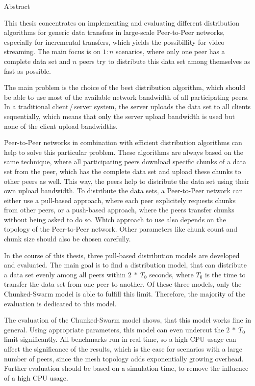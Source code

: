 
\begin{center} 
\huge Abstract
\end{center}


This thesis concentrates on implementing and evaluating different distribution algorithms for generic data transfers in large-scale Peer-to-Peer networks, especially for incremental transfers, which yields the possibillity for video streaming. The main focus is on $1:n$ scenarios, where only one peer has a complete data set and $n$ peers try to distribute this data set among themselves as fast as possible.

The main problem is the choice of the best distribution algorithm, which should be able to use most of the available network bandwidth of all participating peers. In a traditional client\,/\,server system, the server uploads the data set to all clients sequentially, which means that only the server upload bandwidth is used but none of the client upload bandwidths.

Peer-to-Peer networks in combination with efficient distribution algorithms can help to solve this particular problem. These algorithms are always based on the same technique, where all participating peers download specific chunks of a data set from the peer, which has the complete data set and upload these chunks to other peers as well. This way, the peers help to distribute the data set using their own upload bandwidth. To distribute the data sets, a Peer-to-Peer network can either use a pull-based approach, where each peer explicitely requests chunks from other peers, or a push-based approach, where the peers transfer chunks without being asked to do so. Which approach to use also depends on the topology of the Peer-to-Peer network. Other parameters like chunk count and chunk size should also be chosen carefully.

In the course of this thesis, three pull-based distribution models are developed and evaluated. The main goal is to find a distribution model, that can distribute a data set evenly among all peers within $2\:*\:T_0$ seconds, where $T_0$ is the time to transfer the data set from one peer to another. Of these three models, only the Chunked-Swarm model is able to fulfill this limit. Therefore, the majority of the evaluation is dedicated to this model.

The evaluation of the Chunked-Swarm model shows, that this model works fine in general. Using appropriate parameters, this model can even undercut the $2\:*\:T_0$ limit significantly. All benchmarks run in real-time, so a high CPU usage can affect the significance of the results, which is the case for scenarios with a large number of peers, since the mesh topology adds exponentially growing overhead. Further evaluation should be based on a simulation time, to remove the influence of a high CPU usage.